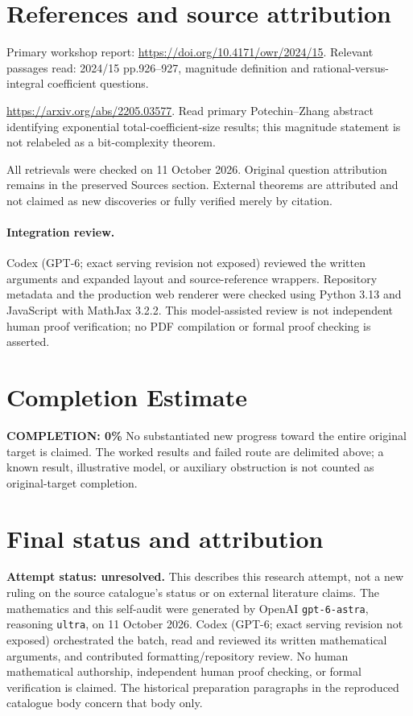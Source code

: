 \documentclass[11pt]{article}
\begin{document}
\section{References and source attribution}
Primary workshop report: \url{https://doi.org/10.4171/owr/2024/15}. Relevant passages read: 2024/15 pp.926--927, magnitude definition and rational-versus-integral coefficient questions.

\url{https://arxiv.org/abs/2205.03577}. Read primary Potechin--Zhang abstract identifying exponential total-coefficient-size results; this magnitude statement is not relabeled as a bit-complexity theorem.

All retrievals were checked on 11 October 2026. Original question attribution remains in the preserved Sources section. External theorems are attributed and not claimed as new discoveries or fully verified merely by citation.


\paragraph{Integration review.} Codex (GPT-6; exact serving revision not exposed) reviewed the written arguments and expanded layout and source-reference wrappers. Repository metadata and the production web renderer were checked using Python 3.13 and JavaScript with MathJax 3.2.2. This model-assisted review is not independent human proof verification; no PDF compilation or formal proof checking is asserted.

\section{Completion Estimate}
\noindent\textbf{COMPLETION: 0\%}
No substantiated new progress toward the entire original target is claimed. The worked results and failed route are delimited above; a known result, illustrative model, or auxiliary obstruction is not counted as original-target completion.

\section{Final status and attribution}
\textbf{Attempt status: unresolved.} This describes this research attempt, not a new ruling on the source catalogue's status or on external literature claims.
The mathematics and this self-audit were generated by OpenAI \texttt{gpt-6-astra}, reasoning \texttt{ultra}, on 11 October 2026. Codex (GPT-6; exact serving revision not exposed) orchestrated the batch, read and reviewed its written mathematical arguments, and contributed formatting/repository review. No human mathematical authorship, independent human proof checking, or formal verification is claimed. The historical preparation paragraphs in the reproduced catalogue body concern that body only.
\end{document}
